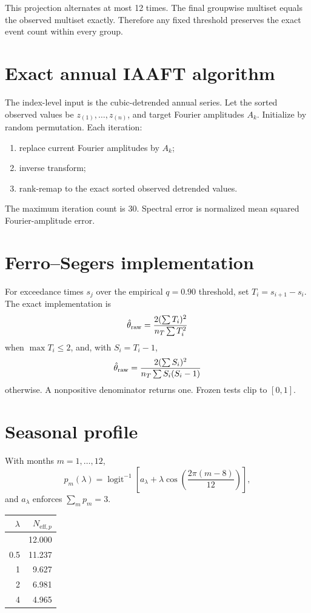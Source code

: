 This projection alternates at most 12 times. The final groupwise multiset equals the observed multiset exactly. Therefore any fixed threshold preserves the exact event count within every group.

\section{Exact annual IAAFT algorithm}\label{exact-annual-iaaft-algorithm}

The index-level input is the cubic-detrended annual series. Let the sorted observed values be \(z_{(1)},\ldots,z_{(n)}\), and target Fourier amplitudes \(A_k\). Initialize by random permutation. Each iteration:

\begin{enumerate}
\def\labelenumi{\arabic{enumi}.}
\tightlist
\item
  replace current Fourier amplitudes by \(A_k\);
\item
  inverse transform;
\item
  rank-remap to the exact sorted observed detrended values.
\end{enumerate}

The maximum iteration count is 30. Spectral error is normalized mean squared Fourier-amplitude error.

\section{Ferro--Segers implementation}\label{ferrosegers-implementation}

For exceedance times \(s_j\) over the empirical \(q=0.90\) threshold, set \(T_i=s_{i+1}-s_i\). The exact implementation is \[
\hat\theta_{\rm raw}
=
\frac{2(\sum T_i)^2}{n_T\sum T_i^2}
\] when \(\max T_i\le2\), and, with \(S_i=T_i-1\), \[
\hat\theta_{\rm raw}
=
\frac{2(\sum S_i)^2}{n_T\sum S_i(S_i-1)}
\] otherwise. A nonpositive denominator returns one. Frozen tests clip to \([0,1]\).

\section{Seasonal profile}\label{seasonal-profile}

With months \(m=1,\ldots,12\), \[
p_m(\lambda)
=
\operatorname{logit}^{-1}
\left[
a_\lambda+\lambda\cos\left(\frac{2\pi(m-8)}{12}\right)
\right],
\] and \(a_\lambda\) enforces \(\sum_m p_m=3\).

\begin{longtable}[]{@{}rr@{}}
\toprule\noalign{}
\(\lambda\) & \(N_{\mathrm{eff},p}\) \\
\midrule\noalign{}
\endhead
\bottomrule\noalign{}
\endlastfoot
0 & 12.000 \\
0.5 & 11.237 \\
1 & 9.627 \\
2 & 6.981 \\
4 & 4.965 \\
\end{longtable}


